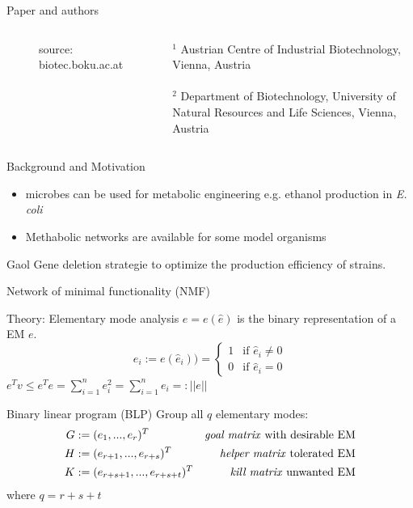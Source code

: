\documentclass{beamer}
\begin{document}
\begin{frame}{Paper and authors}
\begin{columns}
\begin{center}
\begin{figure}
         \tiny{source: biotec.boku.ac.at}
        \end{figure}
      \end{center}
    \tiny {$^{1}$ Austrian Centre of Industrial 
        Biotechnology, Vienna, Austria} 
    \\ ~ \\
    \tiny {$^{2}$ Department of Biotechnology, 
        University of Natural Resources and Life Sciences, 
        Vienna, Austria} 
 \end{columns}
\end{frame}

\begin{frame}{Background and Motivation}
    \begin{itemize}
        \item microbes can be used for metabolic engineering 
        e.g. ethanol production in \emph{E. coli}
        \item Methabolic networks are available for some model organisms
    \end{itemize}
    \begin{block}{Gaol}
        Gene deletion strategie to optimize the production 
        efficiency of strains.
    \end{block}
\end{frame}


\begin{frame}{Network of minimal functionality (NMF)}
    
\end{frame}

\begin{frame}{Theory: Elementary mode analysis}
    $e = e(\hat{e}) $ is the binary representation of a EM $e$.
    \begin{equation}
        e_{i} := e(\hat{e}_{i})) = 
        \begin{cases}
            1 & \text{if }  \hat{e}_{i} \neq 0 \\
            0 & \text{if }  \hat{e}_{i} = 0 
        \end{cases}
    \end{equation}
    $ e^{T}v \leq e^{T}e = \sum_{i=1}^{n} e_{i}^{2} = \sum_{i=1}^{n} e_{i} =: ||e||$

\end{frame}

\begin{frame}{Binary linear program (BLP)}
    Group all $q$ elementary modes:
    \begin{align*}
        G &:= (e_{1}, ..., e_{r})^{T}            &\text{\emph{goal matrix} with desirable EM}   &\\
        H &:= (e_{r+1}, ..., e_{r+s})^{T}        &\text{\emph{helper matrix} tolerated EM}      &\\
        K &:= (e_{r+s+1}, ..., e_{r+s+t})^{T}    &\text{\emph{kill matrix} unwanted EM}         &\\
    \end{align*}
where $q = r+s+t$
\end{frame}
\end{document}
